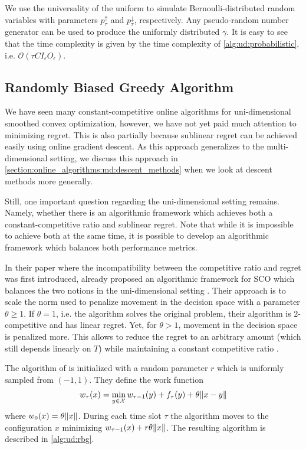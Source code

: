 We use the universality of the uniform to simulate Bernoulli-distributed random variables with parameters $p_{\tau}^{\uparrow}$ and $p_{\tau}^{\downarrow}$, respectively. Any pseudo-random number generator can be used to produce the uniformly distributed $\gamma$. It is easy to see that the time complexity is given by the time complexity of \autoref{alg:ud:probabilistic}, i.e. $\mathcal{O}(\tau C I_{\epsilon} O_{\epsilon})$.

\subsection{Randomly Biased Greedy Algorithm}

We have seen many constant-competitive online algorithms for uni-dimensional smoothed convex optimization, however, we have not yet paid much attention to minimizing regret. This is also partially because sublinear regret can be achieved easily using online gradient descent. As this approach generalizes to the multi-dimensional setting, we discuss this approach in \autoref{section:online_algorithms:md:descent_methods} when we look at descent methods more generally.

Still, one important question regarding the uni-dimensional setting remains. Namely, whether there is an algorithmic framework which achieves both a constant-competitive ratio and sublinear regret. Note that while it is impossible to achieve both at the same time, it is possible to develop an algorithmic framework which balances both performance metrics.

In their paper where the incompatibility between the competitive ratio and regret was first introduced, \citeauthor*{Andrew2015} already proposed an algorithmic framework for SCO which balances the two notions in the uni-dimensional setting \cite{Andrew2015}. Their approach is to scale the norm used to penalize movement in the decision space with a parameter $\theta \geq 1$. If $\theta = 1$, i.e. the algorithm solves the original problem, their algorithm is $2$-competitive and has linear regret. Yet, for $\theta > 1$, movement in the decision space is penalized more. This allows to reduce the regret to an arbitrary amount (which still depends linearly on $T$) while maintaining a constant competitive ratio \cite{Andrew2015}.

The algorithm of \citeauthor*{Andrew2015} is initialized with a random parameter $r$ which is uniformly sampled from $({-1,1})$. They define the work function \begin{align}\label{eq:randomly_biased_greedy:work_function}
    w_{\tau}(x) = \min_{y \in \mathcal{X}} w_{\tau-1}(y) + f_{\tau}(y) + \theta \lVert x - y\rVert
\end{align} where $w_0(x) = \theta \lVert x\rVert$. During each time slot $\tau$ the algorithm moves to the configuration $x$ minimizing $w_{\tau-1}(x) + r \theta \lVert x\rVert$. The resulting algorithm is described in \autoref{alg:ud:rbg}.

